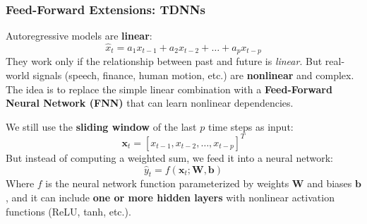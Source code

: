 \subsubsection{Feed-Forward Extensions: TDNNs}\label{sec:feed-forward-extensions-time-delay-neural-networks-tdnn}

Autoregressive models are \textbf{linear}:
\begin{equation*}
    \hat{x}_t = a_1 x_{t-1} + a_2 x_{t-2} + \ldots + a_p x_{t-p}
\end{equation*}
They work only if the relationship between past and future is \emph{linear}. But real-world signals (speech, finance, human motion, etc.) are \textbf{nonlinear} and complex. The idea is to replace the simple linear combination with a \textbf{Feed-Forward Neural Network (FNN)} that can learn nonlinear dependencies.

\highspace
We still use the \textbf{sliding window} of the last $p$ time steps as input:
\begin{equation*}
    \mathbf{x}_t = \left[x_{t-1}, x_{t-2}, \ldots, x_{t-p}\right]^T
\end{equation*}
But instead of computing a weighted sum, we feed it into a neural network:
\begin{equation*}
    \hat{y}_t = f\left(\mathbf{x}_t; \mathbf{W}, \mathbf{b}\right)
\end{equation*}
Where $f$ is the neural network function parameterized by weights $\mathbf{W}$ and biases $\mathbf{b}$, and it can include \textbf{one or more hidden layers} with nonlinear activation functions (ReLU, tanh, etc.).


